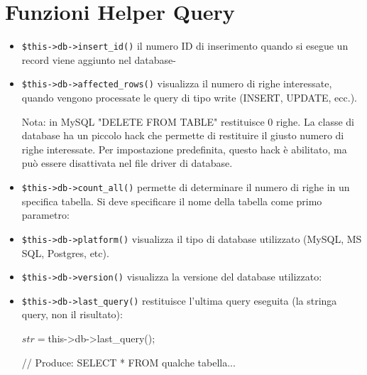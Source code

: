 \section*{Funzioni Helper Query}

\begin{itemize}
\item \verb|$this->db->insert_id()| il numero ID di inserimento quando si esegue un record viene aggiunto nel database-

\item \verb|$this->db->affected_rows()| visualizza il numero di righe interessate, quando vengono processate le query di tipo  write (INSERT, UPDATE, ecc.).

Nota: in MySQL "DELETE FROM TABLE" restituisce 0 righe. La classe di database ha un piccolo hack che permette di restituire il giusto numero di righe interessate. Per impostazione predefinita, questo hack è abilitato, ma può essere disattivata nel file driver di database.

\item \verb|$this->db->count_all()| permette di determinare il numero di righe in un specifica tabella. Si deve specificare il nome della tabella come primo parametro:


\item \verb|$this->db->platform()| visualizza il tipo di database utilizzato (MySQL, MS SQL, Postgres, etc).


\item \verb|$this->db->version()| visualizza la versione del database utilizzato:


\item \verb|$this->db->last_query()| restituisce l'ultima query eseguita (la stringa query, non il risultato):

\begin{code}
$str = $this->db->last_query();

// Produce: SELECT * FROM qualche tabella...
\end{code}


\end{itemize}
